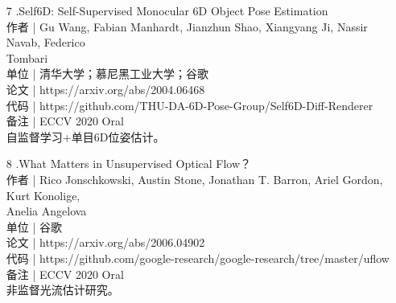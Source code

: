 \documentclass{article}
\begin{document}
\begin{itemize}
	   	\item 
	   	[7].Self6D: Self-Supervised Monocular 6D Object Pose Estimation\\
	   	作者 | Gu Wang, Fabian Manhardt, Jianzhun Shao, Xiangyang Ji, Nassir Navab, Federico\\ Tombari\\
	   	单位 | 清华大学；慕尼黑工业大学；谷歌\\
	   	论文 | https://arxiv.org/abs/2004.06468\\
	   	代码 | https://github.com/THU-DA-6D-Pose-Group/Self6D-Diff-Renderer\\
	   	备注 | ECCV 2020 Oral \\
	   	自监督学习+单目6D位姿估计。\\
	   	
	   	\item 
	   	[8].What Matters in Unsupervised Optical Flow？\\
	   	作者 | Rico Jonschkowski, Austin Stone, Jonathan T. Barron, Ariel Gordon, Kurt Konolige,\\ Anelia Angelova\\
	   	单位 | 谷歌\\
	   	论文 | https://arxiv.org/abs/2006.04902\\
	   	代码 | https://github.com/google-research/google-research/tree/master/uflow\\
	   	备注 | ECCV 2020 Oral \\
	   	非监督光流估计研究。\\
	   	

\end{itemize}
\end{document}
